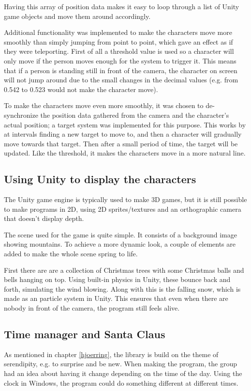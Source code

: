 Having this array of position data makes it easy to loop through a list of Unity game objects and move them around accordingly.

Additional functionality was implemented to make the characters move more smoothly than simply jumping from point to point, which gave an effect as if they were teleporting. First of all a threshold value is used so a character will only move if the person moves enough for the system to trigger it. This means that if a person is standing still in front of the camera, the character on screen will not jump around due to the small changes in the decimal values (e.g. from 0.542 to 0.523 would not make the character move).

To make the characters move even more smoothly, it was chosen to de-synchronize the position data gathered from the camera and the character's actual position; a target system was implemented for this purpose. This works by at intervals finding a new target to move to, and then a character will gradually move towards that target. Then after a small period of time, the target will be updated. Like the threshold, it makes the characters move in a more natural line.

\subsection{Using Unity to display the characters}
The Unity game engine is typically used to make 3D games, but it is still possible to make programs in 2D, using 2D sprites/textures and an orthographic camera that doesn't display depth.

The scene used for the game is quite simple. It consists of a background image showing mountains. To achieve a more dynamic look, a couple of elements are added to make the whole scene spring to life.

First there are are a collection of Christmas trees with some Christmas balls and bells hanging on top. Using built-in physics in Unity, these bounce back and forth, simulating the wind blowing. Along with this is the falling snow, which is made as an particle system in Unity. This ensures that even when there are nobody in front of the camera, the program still feels alive.

\subsection{Time manager and Santa Claus}
As mentioned in chapter \ref{hjoerring}, the library is build on the theme of serendipity, e.g. to surprise and be new. When making the program, the group had an idea about having it change depending on the time of the day. Using the clock in Windows, the program could do something different at different times.

